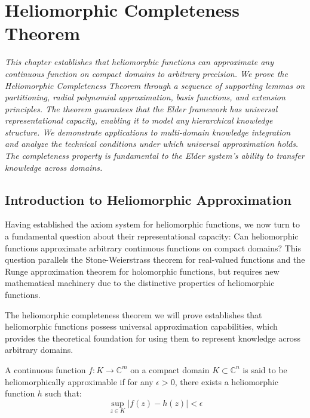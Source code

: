 \chapter{Heliomorphic Completeness Theorem}

\textit{This chapter establishes that heliomorphic functions can approximate any continuous function on compact domains to arbitrary precision. We prove the Heliomorphic Completeness Theorem through a sequence of supporting lemmas on partitioning, radial polynomial approximation, basis functions, and extension principles. The theorem guarantees that the Elder framework has universal representational capacity, enabling it to model any hierarchical knowledge structure. We demonstrate applications to multi-domain knowledge integration and analyze the technical conditions under which universal approximation holds. The completeness property is fundamental to the Elder system's ability to transfer knowledge across domains.}

\section{Introduction to Heliomorphic Approximation}

Having established the axiom system for heliomorphic functions, we now turn to a fundamental question about their representational capacity: Can heliomorphic functions approximate arbitrary continuous functions on compact domains? This question parallels the Stone-Weierstrass theorem for real-valued functions and the Runge approximation theorem for holomorphic functions, but requires new mathematical machinery due to the distinctive properties of heliomorphic functions.

The heliomorphic completeness theorem we will prove establishes that heliomorphic functions possess universal approximation capabilities, which provides the theoretical foundation for using them to represent knowledge across arbitrary domains.

\begin{definition}
A continuous function $f: K \rightarrow \mathbb{C}^m$ on a compact domain $K \subset \mathbb{C}^n$ is said to be heliomorphically approximable if for any $\epsilon > 0$, there exists a heliomorphic function $h$ such that:
\begin{equation}
\sup_{z \in K} |f(z) - h(z)| < \epsilon
\end{equation}
\end{definition}

